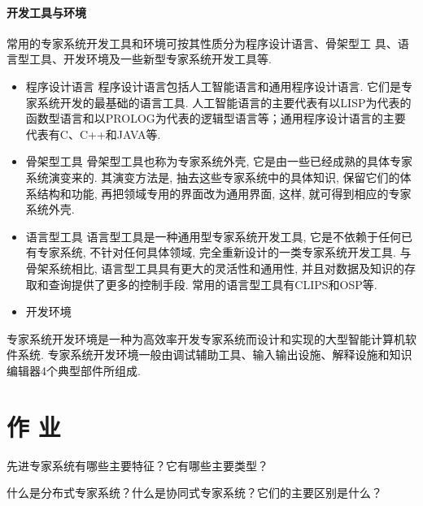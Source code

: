 \paragraph{开发工具与环境}
常用的专家系统开发工具和环境可按其性质分为程序设计语言、骨架型工 具、语言型工具、开发环境及一些新型专家系统开发工具等.
\begin{itemize}
\item 程序设计语言
    程序设计语言包括人工智能语言和通用程序设计语言. 它们是专家系统开发的最基础的语言工具. 人工智能语言的主要代表有以LISP为代表的函数型语言和以PROLOG为代表的逻辑型语言等；通用程序设计语言的主要代表有C、C++和JAVA等.
\item 骨架型工具
    骨架型工具也称为专家系统外壳, 它是由一些已经成熟的具体专家系统演变来的. 其演变方法是, 抽去这些专家系统中的具体知识, 保留它们的体系结构和功能, 再把领域专用的界面改为通用界面, 这样, 就可得到相应的专家系统外壳.
\item 语言型工具
    语言型工具是一种通用型专家系统开发工具, 它是不依赖于任何已有专家系统, 不针对任何具体领域, 完全重新设计的一类专家系统开发工具. 与骨架系统相比, 语言型工具具有更大的灵活性和通用性, 并且对数据及知识的存取和查询提供了更多的控制手段. 常用的语言型工具有CLIPS和OSP等.
\item 开发环境
\end{itemize}

专家系统开发环境是一种为高效率开发专家系统而设计和实现的大型智能计算机软件系统. 专家系统开发环境一般由调试辅助工具、输入输出设施、解释设施和知识编辑器4个典型部件所组成.
\section{作 业}
\begin{think}
先进专家系统有哪些主要特征？它有哪些主要类型？
\end{think}
\begin{think}
什么是分布式专家系统？什么是协同式专家系统？它们的主要区别是什么？
\end{think}
